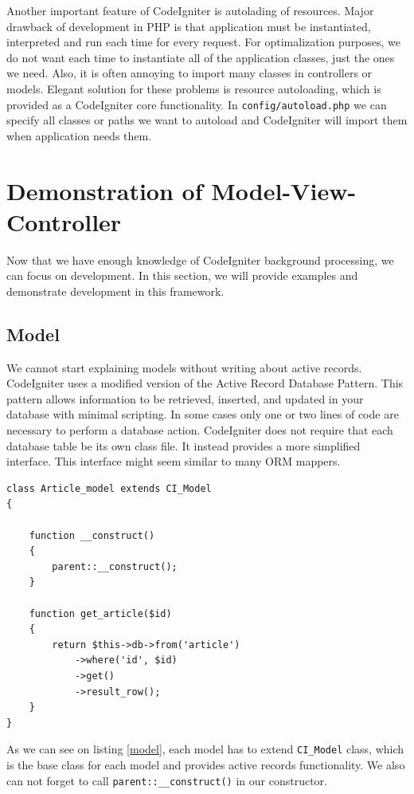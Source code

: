 Another important feature of CodeIgniter is autolading of resources. Major drawback of development in PHP is that application must be instantiated, interpreted and run each time for every request. For optimalization purposes, we do not want each time to instantiate all of the application classes, just the ones we need. Also, it is often annoying to import many classes in controllers or models. Elegant solution for these problems is resource autoloading, which is provided as a CodeIgniter core functionality. In \texttt{config/autoload.php} we can specify all classes or paths we want to autoload and CodeIgniter will import them when application needs them.


\section{Demonstration of Model-View-Controller}
Now that we have enough knowledge of CodeIgniter background processing, we can focus on development. In this section, we will provide examples and demonstrate development in this framework.

\subsection{Model}

We cannot start explaining models without writing about active records. CodeIgniter uses a modified version of the Active Record Database Pattern. This pattern allows information to be retrieved, inserted, and updated in your database with minimal scripting. In some cases only one or two lines of code are necessary to perform a database action. CodeIgniter does not require that each database table be its own class file. It instead provides a more simplified interface. \cite{codeigniter} This interface might seem similar to many ORM mappers.

\begin{lstlisting}[label={model}, caption={Article model}]
class Article_model extends CI_Model
{

    function __construct()
    {
        parent::__construct();
    }

    function get_article($id)
    {
        return $this->db->from('article')
            ->where('id', $id)
            ->get()
            ->result_row();
    }
}
\end{lstlisting}



As we can see on listing \ref{model}, each model has to extend \texttt{CI\_Model} class, which is the base class for each model and provides active records functionality. We also can not forget to call \texttt{parent::\_\_construct()} in our constructor.



